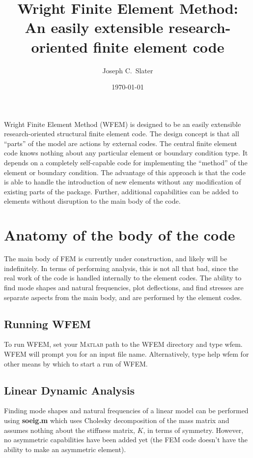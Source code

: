 \documentclass[12pt]{article}
\title{Wright Finite Element Method:\\
  \small{An easily extensible research-oriented finite element code}}
\author{Joseph C.~Slater} \date{\today}
\newcommand*{\command}[1]{\textsf{#1}}
\newcommand*{\filename}[1]{\textsf{\textbf{#1}}}
\begin{document}
\lstset{language=Matlab,numbers=left,numberstyle=\tiny,keywordstyle=\bfseries,escapechar=!}
\maketitle 
\newpage
\tableofcontents
\newpage 
Wright Finite Element Method (WFEM) is designed to be an
easily extensible research-oriented structural finite element code.
The design concept is that all ``parts'' of the model are actions by
external codes. The central finite element code knows nothing about
any particular element or boundary condition type. It depends on a
completely self-capable code for implementing the ``method'' of the
element or boundary condition. The advantage of this approach is that
the code is able to handle the introduction of new elements without
any modification of existing parts of the package. Further, additional
capabilities can be added to elements without disruption to the main
body of the code.

\section{Anatomy of the body of the code}
The main body of FEM is currently under construction, and likely will
be indefinitely. In terms of performing analysis, this is not all that
bad, since the real work of the code is handled internally to the
element codes. The ability to find mode shapes and natural
frequencies, plot deflections, and find stresses are separate aspects
from the main body, and are performed by the element codes.
\subsection{Running WFEM}
To run WFEM, set your M\textsc{atlab}{}{} path to the WFEM directory and type \command{wfem}. WFEM will prompt you for an input file name. Alternatively, type \command{help wfem} for other means by which to start a run of WFEM. 
\subsection{Linear Dynamic Analysis}
Finding mode shapes and natural frequencies of a linear model can be
performed using \filename{soeig.m} which uses Cholesky decomposition
of the mass matrix and assumes nothing about the stiffness matrix,
$K$, in terms of symmetry. However, no asymmetric capabilities have
been added yet (the FEM code doesn't have the ability to make an
asymmetric element).
\end{document}
